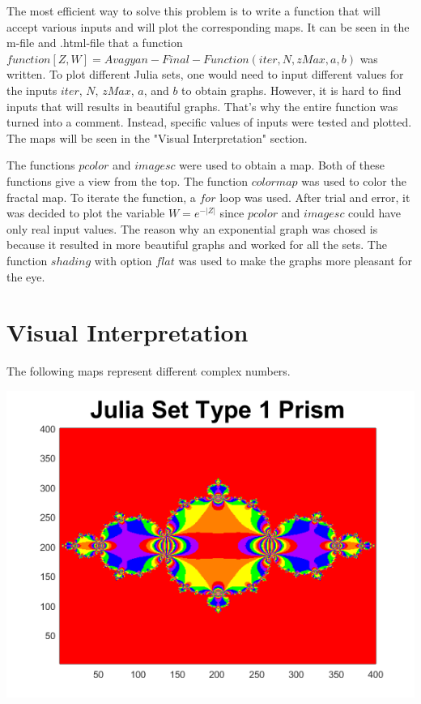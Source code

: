 \documentclass[11pt]{article}
\begin{document}
The most efficient way to solve this problem is to write a function that will accept various inputs and will plot the corresponding maps. It can be seen in the m-file and .html-file that a function $function [Z,W] = Avagyan-Final-Function(iter,N,zMax,a,b)$ was written. To plot different Julia sets, one would need to input different values for the inputs $iter$, $N$, $zMax$, $a$, and $b$ to obtain graphs. However, it is hard to find inputs that will results in beautiful graphs. That's why the entire function was turned into a comment. Instead, specific values of inputs were tested and plotted. The maps will be seen in the "Visual Interpretation" section.

The functions $pcolor$ and $imagesc$ were used to obtain a map. Both of these functions give a view from the top. The function $colormap$ was used to color the fractal map. To iterate the function, a $for$ loop was used. After trial and error, it was decided to plot the variable $W = e^{-|Z|}$ since $pcolor$ and $imagesc$ could have only real input values. The reason why an exponential graph was chosed is because it resulted in more beautiful graphs and worked for all the sets.
The function $shading$ with option $flat$ was used to make the graphs more pleasant for the eye.


\section{Visual Interpretation}
The following maps represent different complex numbers.
\begin{center}
\includegraphics[width=\textwidth] {Set_1_prism.png}
\end{center}
\end{document}
